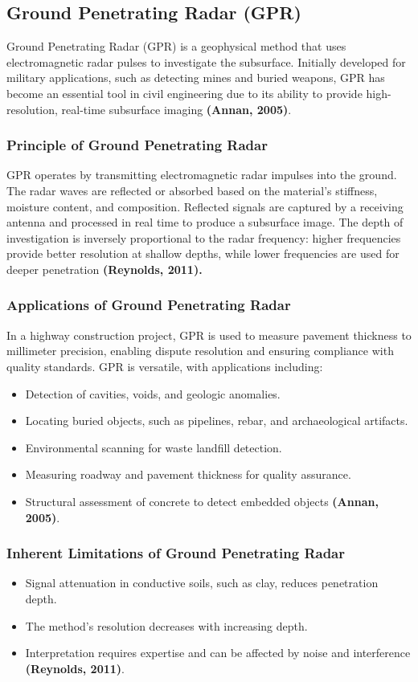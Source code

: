 \documentclass[12pt,a4paper]{report}
\begin{document}
\subsection{Ground Penetrating Radar (GPR)}
Ground Penetrating Radar (GPR) is a geophysical method that uses electromagnetic radar pulses to investigate the subsurface. Initially developed for military applications, such as detecting mines and buried weapons, GPR has become an essential tool in civil engineering due to its ability to provide high-resolution, real-time subsurface imaging \textbf{(Annan, 2005)}.

\subsubsection{Principle of Ground Penetrating Radar}
GPR operates by transmitting electromagnetic radar impulses into the ground. The radar waves are reflected or absorbed based on the material's stiffness, moisture content, and composition. Reflected signals are captured by a receiving antenna and processed in real time to produce a subsurface image. The depth of investigation is inversely proportional to the radar frequency: higher frequencies provide better resolution at shallow depths, while lower frequencies are used for deeper penetration \textbf{(Reynolds, 2011).}

\subsubsection{Applications of Ground Penetrating Radar}
In a highway construction project, GPR is used to measure pavement thickness to millimeter precision, enabling dispute resolution and ensuring compliance with quality standards. GPR is versatile, with applications including:
\begin{itemize}
    \item Detection of cavities, voids, and geologic anomalies.
    \item Locating buried objects, such as pipelines, rebar, and archaeological artifacts.
    \item Environmental scanning for waste landfill detection.
    \item Measuring roadway and pavement thickness for quality assurance.
    \item Structural assessment of concrete to detect embedded objects \textbf{(Annan, 2005)}.
\end{itemize}

\subsubsection{Inherent Limitations of Ground Penetrating Radar}
\begin{itemize}
    \item Signal attenuation in conductive soils, such as clay, reduces penetration depth.
    \item The method's resolution decreases with increasing depth.
    \item Interpretation requires expertise and can be affected by noise and interference \textbf{(Reynolds, 2011)}.
\end{itemize}
\end{document}

